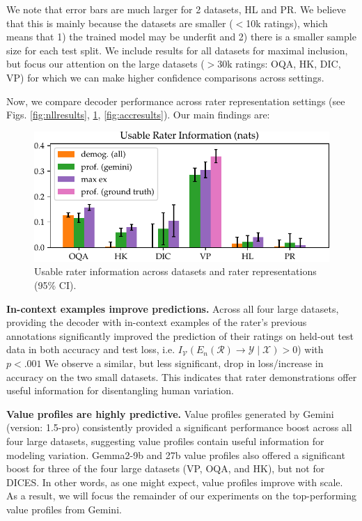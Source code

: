 \documentclass[11pt]{article}
\begin{document}
We note that error bars are much larger for 2 datasets, HL and PR. We believe that this is mainly because the datasets are smaller ($<$10k ratings), which means that 1) the trained model may be underfit and 2) there is a smaller sample size for each test split. We include results for all datasets for maximal inclusion, but focus our attention on the large datasets ($>$30k ratings: OQA, HK, DIC, VP) for which we can make higher confidence comparisons across settings.

Now, we compare decoder performance across rater representation settings (see Figs. \ref{fig:nllresults}, \ref{fig:rater_info},  \ref{fig:accresults}).
Our main findings are:

\begin{figure}
\centering
\includegraphics[width=0.75\columnwidth]{files/rater_info.pdf}

\caption{
Usable rater information across datasets and rater representations (95\% CI).
}
\label{fig:rater_info}
\vspace{-15pt}
\end{figure}

\textbf{In-context examples improve predictions.} 
Across all four large datasets, providing the decoder with in-context examples of the rater's previous annotations significantly improved the prediction of their ratings on held-out test data in both accuracy and test loss, i.e.  $I_\mathcal{V}(E_n(\mathcal{R}) \to \mathcal{Y} \mid \mathcal{X}) > 0$) with $p < .001$ We observe a similar, but less significant, drop in loss/increase in accuracy on the two small datasets. This indicates that rater demonstrations offer useful information for disentangling human variation.

\textbf{Value profiles are highly predictive.} 
Value profiles generated by Gemini (version: 1.5-pro) consistently provided a significant performance boost across all four large datasets, suggesting value profiles contain useful information for modeling variation. Gemma2-9b and 27b value profiles also offered a significant boost for three of the four large datasets (VP, OQA, and HK), but not for DICES. In other words, as one might expect, value profiles improve with scale. As a result, we will focus the remainder of our experiments on the top-performing value profiles from Gemini.
\end{document}
